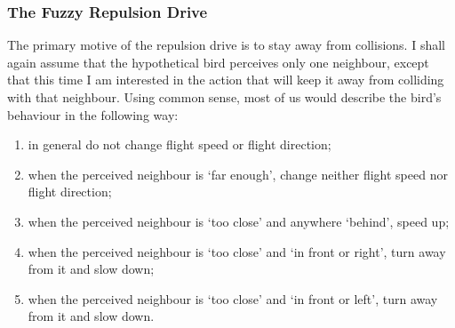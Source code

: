 \subsubsection{The Fuzzy Repulsion Drive}
The primary motive of the repulsion drive is to stay away from collisions. I shall again assume that the hypothetical bird perceives only one neighbour, except that this time I am interested in the action that will keep it away from colliding with that neighbour. Using common sense, most of us would describe the bird's behaviour in the following way:
\begin{enumerate}
\item in general do not change flight speed or flight direction;
\item when the perceived neighbour is `far enough', change neither flight speed nor flight direction;
\item when the perceived neighbour is `too close' and anywhere `behind', speed up;
\item when the perceived neighbour is `too close' and `in front or right', turn away from it and slow down;
\item when the perceived neighbour is `too close' and `in front or left', turn away from it and slow down.
\end{enumerate}

